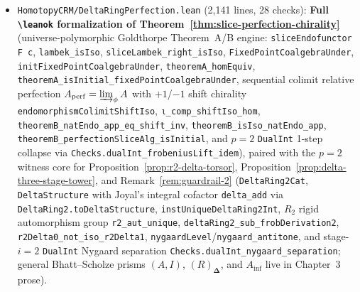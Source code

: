 \documentclass[10pt,twoside,openright]{book}
\theoremstyle{crmplain}
\theoremstyle{crmdef}
\theoremstyle{crmremark}
\newcommand{\Prism}{\mathbf{\Delta}}
\begin{document}
\begin{itemize}[leftmargin=1.5em]
  \item \texttt{HomotopyCRM/\allowbreak DeltaRingPerfection.lean} (2,141 lines, 28 checks): \textbf{Full \texttt{\textbackslash leanok} formalization of Theorem~\ref{thm:slice-perfection-chirality}} (universe-polymorphic Goldthorpe Theorem~A/B engine: \texttt{sliceEndofunctor F c}, \texttt{lambek\_\allowbreak isIso}, \texttt{sliceLambek\_\allowbreak right\_\allowbreak isIso}, \texttt{FixedPoint\allowbreak CoalgebraUnder}, \texttt{initFixedPoint\allowbreak CoalgebraUnder}, \texttt{theoremA\_\allowbreak homEquiv}, \texttt{theoremA\_\allowbreak isInitial\_\allowbreak fixedPoint\allowbreak CoalgebraUnder}, sequential colimit relative perfection $A_{\mathrm{perf}} = \varinjlim_\phi A$ with $+1$/$-1$ shift chirality \texttt{endomorphism\allowbreak Colimit\allowbreak ShiftIso}, \texttt{ι\_\allowbreak comp\_\allowbreak shiftIso\_\allowbreak hom}, \texttt{theoremB\_\allowbreak natEndo\_\allowbreak app\_\allowbreak eq\_\allowbreak shift\_\allowbreak inv}, \texttt{theoremB\_\allowbreak isIso\_\allowbreak natEndo\_\allowbreak app}, \texttt{theoremB\_\allowbreak perfection\allowbreak SliceAlg\_\allowbreak isInitial}, and $p=2$ \texttt{DualInt} 1-step collapse via \texttt{Checks.dualInt\_\allowbreak frobeniusLift\_\allowbreak idem}), paired with the $p=2$ witness core for Proposition~\ref{prop:r2-delta-torsor}, Proposition~\ref{prop:delta-three-stage-tower}, and Remark~\ref{rem:guardrail-2} (\texttt{DeltaRing2Cat}, \texttt{DeltaStructure} with Joyal's integral cofactor \texttt{delta\_add} via \texttt{DeltaRing2.\allowbreak toDeltaStructure}, \texttt{instUniqueDeltaRing2Int}, $R_2$ rigid automorphism group \texttt{r2\_\allowbreak aut\_\allowbreak unique}, \texttt{deltaRing2\_\allowbreak sub\_\allowbreak frobDerivation2}, \texttt{r2Delta0\_\allowbreak not\_\allowbreak iso\_\allowbreak r2Delta1}, \texttt{nygaardLevel}/\allowbreak\texttt{nygaard\_\allowbreak antitone}, and stage-$i=2$ \texttt{DualInt} Nygaard separation \texttt{Checks.\allowbreak dualInt\_\allowbreak nygaard\_\allowbreak separation}; general Bhatt--Scholze prisms $(A,I)$, $(R)_{\Prism}$, and $A_{\mathrm{inf}}$ live in Chapter~3 prose).

\end{itemize}
\end{document}
